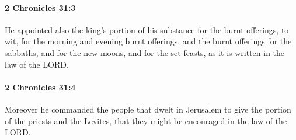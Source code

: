 		\paragraph{2 Chronicles 31:3} %
			\label{2CHRONICLES-31-3}

			He appointed also the king's portion of his substance for the burnt offerings, to wit, for the morning and evening burnt offerings, and the burnt offerings for the sabbaths, and for the new moons, and for the set feasts, as it is written in the law of the LORD.


		\paragraph{2 Chronicles 31:4} %
			\label{2CHRONICLES-31-4}

			Moreover he commanded the people that dwelt in Jerusalem to give the portion of the priests and the Levites, that they might be encouraged in the law of the LORD.

